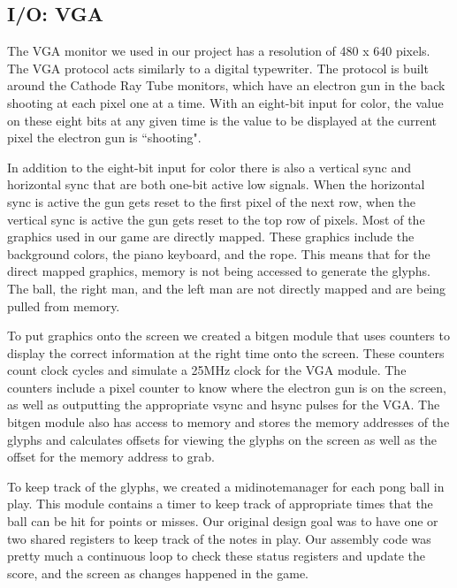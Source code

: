 \documentclass[onecolumn, 12pt]{IEEEtran}
\begin{document}
\subsection{I/O: VGA}
The VGA monitor we used in our project has a resolution of 480 x 640 pixels. The VGA protocol acts similarly to a digital typewriter. The protocol is built around the Cathode Ray Tube monitors, which have an electron gun in the back shooting at each pixel one at a time. With an eight-bit input for color, the value on these eight bits at any given time is the value to be displayed at the current pixel the electron gun is ``shooting".
\par
In addition to the eight-bit input for color there is also a vertical sync and horizontal sync that are both one-bit active low signals. When the horizontal sync is active the gun gets reset to the first pixel of the next row, when the vertical sync is active the gun gets reset to the top row of pixels.
Most of the graphics used in our game are directly mapped. These graphics include the background colors, the piano keyboard, and the rope. This means that for the direct mapped graphics, memory is not being accessed to generate the glyphs. The ball, the right man, and the left man are not directly mapped and are being pulled from memory.
\par
To put graphics onto the screen we created a bitgen module that uses counters to display the correct information at the right time onto the screen. These counters count clock cycles and simulate a 25MHz clock for the VGA module. The counters include a pixel counter to know where the electron gun is on the screen, as well as outputting the appropriate vsync and hsync pulses for the VGA. The bitgen module also has access to memory and stores the memory addresses of the glyphs and calculates offsets for viewing the glyphs on the screen as well as the offset for the memory address to grab.
\par
To keep track of the glyphs, we created a midinotemanager for each pong ball in play. This module contains a timer to keep track of appropriate times that the ball can be hit for points or misses.
Our original design goal was to have one or two shared registers to keep track of the notes in play. Our assembly code was pretty much a continuous loop to check these status registers and update the score, and the screen as changes happened in the game. 
\end{document}
